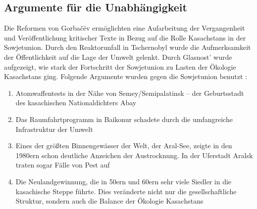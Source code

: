 \documentclass{../../sem_paper}
\begin{document}
\subsection{Argumente für die Unabhängigkeit}
Die Reformen von Gorbačëv ermöglichten eine Aufarbeitung der Vergangenheit und
Veröffentlichung kritischer Texte in Bezug auf die Rolle Kasachstans in der
Sowjetunion. Durch den Reaktorunfall in Tschernobyl wurde die Aufmerksamkeit der
Öffentlichkeit auf die Lage der Umwelt gelenkt. Durch Glasnost'
wurde aufgezeigt, wie stark der Fortschritt der Sowjetunion zu Lasten der Ökologie
Kasachstans ging. Folgende Argumente wurden gegen die Sowjetunion benutzt \autocite[60]{trut1994}:
\begin{enumerate}
 \item Atomwaffentests in der Nähe von Semey/Semipalatinsk – der Geburtsstadt des
kasachischen Nationaldichters Abay
\item Das Raumfahrtprogramm in Baikonur schadete durch die umfangreiche
Infrastruktur der Umwelt
\item Eines der größten Binnengewässer der Welt, der Aral-See, zeigte in den 1980ern
schon deutliche Anzeichen der Austrocknung. In der Uferstadt Aralsk traten sogar Fälle
von Pest auf
\item Die Neulandgewinnung, die in 50ern und 60ern sehr viele Siedler in die
kasachische Steppe führte. Dies veränderte nicht nur die gesellschaftliche Struktur,
sondern auch die Balance der Ökologie Kasachstans 
\end{enumerate}
\end{document}
